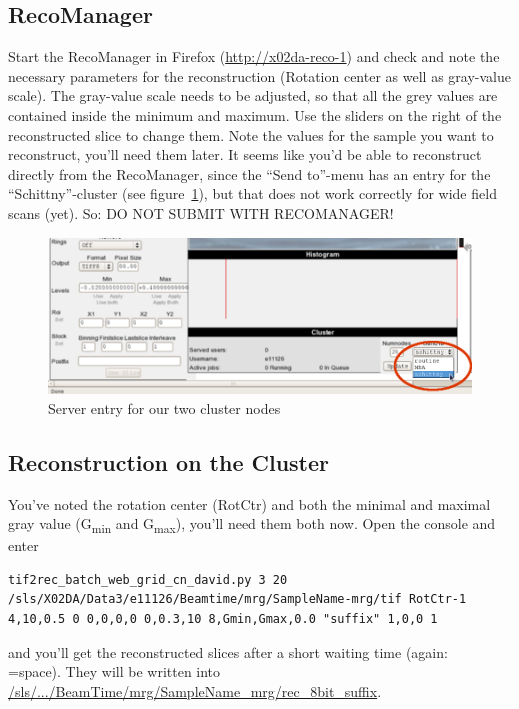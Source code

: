 \documentclass[a4paper]{scrartcl}
\newcommand{\imsize}{.618\linewidth}
\begin{document}
\subsection{RecoManager}
Start the RecoManager in Firefox (\url{http://x02da-reco-1}) and check and note the necessary parameters for the reconstruction (Rotation center as well as gray-value scale). The gray-value scale needs to be adjusted, so that all the grey values are contained inside the minimum and maximum. Use the sliders on the right of the reconstructed slice to change them. Note the values for the sample you want to reconstruct, you'll need them later. It seems like you'd be able to reconstruct directly from the RecoManager, since the ``Send to''-menu has an entry for the ``Schittny''-cluster (see figure~\ref{fig:schittny-cluster}), but that does not work correctly for wide field scans (yet). So: DO NOT SUBMIT WITH RECOMANAGER!

\renewcommand{\imsize}{.618\linewidth}%
\begin{figure}[htp]
	\centering
		\includegraphics[width=\imsize]{img/cluster}
	\caption{Server entry for our two cluster nodes}
	\label{fig:schittny-cluster}
\end{figure}

\subsection{Reconstruction on the Cluster}
You've noted the rotation center (RotCtr) and both the minimal and maximal gray value (G\textsubscript{min} and G\textsubscript{max}), you'll need them both now. Open the console and enter 
\begin{lstlisting}
tif2rec_batch_web_grid_cn_david.py 3 20 /sls/X02DA/Data3/e11126/Beamtime/mrg/SampleName-mrg/tif RotCtr-1 4,10,0.5 0 0,0,0,0 0,0.3,10 8,Gmin,Gmax,0.0 "suffix" 1,0,0 1
\end{lstlisting}
and you'll get the reconstructed slices after a short waiting time (again: \verb*+ + =space). They will be written into \url{/sls/.../BeamTime/mrg/SampleName_mrg/rec_8bit_suffix}.
\end{document}
